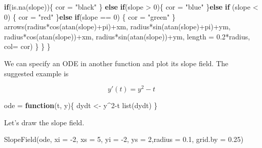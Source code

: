 \documentclass[
]{book}
\newenvironment{Shaded}{\begin{snugshade}}{\end{snugshade}}
\newcommand{\AttributeTok}[1]{\textcolor[rgb]{0.77,0.63,0.00}{#1}}
\newcommand{\ControlFlowTok}[1]{\textcolor[rgb]{0.13,0.29,0.53}{\textbf{#1}}}
\newcommand{\DecValTok}[1]{\textcolor[rgb]{0.00,0.00,0.81}{#1}}
\newcommand{\FloatTok}[1]{\textcolor[rgb]{0.00,0.00,0.81}{#1}}
\newcommand{\FunctionTok}[1]{\textcolor[rgb]{0.00,0.00,0.00}{#1}}
\newcommand{\NormalTok}[1]{#1}
\newcommand{\OtherTok}[1]{\textcolor[rgb]{0.56,0.35,0.01}{#1}}
\newcommand{\SpecialCharTok}[1]{\textcolor[rgb]{0.00,0.00,0.00}{#1}}
\newcommand{\StringTok}[1]{\textcolor[rgb]{0.31,0.60,0.02}{#1}}
\begin{document}
\begin{Shaded}
\begin{Highlighting}[]
      \ControlFlowTok{if}\NormalTok{(}\FunctionTok{is.na}\NormalTok{(slope))\{}
\NormalTok{        cor }\OtherTok{=} \StringTok{"black"}
\NormalTok{      \} }\ControlFlowTok{else} \ControlFlowTok{if}\NormalTok{(slope }\SpecialCharTok{\textgreater{}} \DecValTok{0}\NormalTok{)\{}
\NormalTok{        cor }\OtherTok{=} \StringTok{"blue"}
\NormalTok{      \}}\ControlFlowTok{else} \ControlFlowTok{if}\NormalTok{ (slope }\SpecialCharTok{\textless{}} \DecValTok{0}\NormalTok{) \{}
\NormalTok{        cor }\OtherTok{=} \StringTok{"red"}
\NormalTok{      \}}\ControlFlowTok{else} \ControlFlowTok{if}\NormalTok{(slope }\SpecialCharTok{==} \DecValTok{0}\NormalTok{) \{}
\NormalTok{        cor }\OtherTok{=} \StringTok{"green"}
\NormalTok{      \}}
      \FunctionTok{arrows}\NormalTok{(radius}\SpecialCharTok{*}\FunctionTok{cos}\NormalTok{(}\FunctionTok{atan}\NormalTok{(slope)}\SpecialCharTok{+}\NormalTok{pi)}\SpecialCharTok{+}\NormalTok{xm,}
\NormalTok{             radius}\SpecialCharTok{*}\FunctionTok{sin}\NormalTok{(}\FunctionTok{atan}\NormalTok{(slope)}\SpecialCharTok{+}\NormalTok{pi)}\SpecialCharTok{+}\NormalTok{ym,}
\NormalTok{             radius}\SpecialCharTok{*}\FunctionTok{cos}\NormalTok{(}\FunctionTok{atan}\NormalTok{(slope))}\SpecialCharTok{+}\NormalTok{xm,}
\NormalTok{             radius}\SpecialCharTok{*}\FunctionTok{sin}\NormalTok{(}\FunctionTok{atan}\NormalTok{(slope))}\SpecialCharTok{+}\NormalTok{ym, }
             \AttributeTok{length =} \FloatTok{0.2}\SpecialCharTok{*}\NormalTok{radius, }\AttributeTok{col=}\NormalTok{ cor)}
\NormalTok{    \}}
\NormalTok{  \}}
\NormalTok{\}}
\end{Highlighting}
\end{Shaded}

We can specify an ODE in another function and plot its slope field. The suggested example is

\[y'(t) = y^2 - t \]

\begin{Shaded}
\begin{Highlighting}[]
\NormalTok{ode }\OtherTok{=} \ControlFlowTok{function}\NormalTok{(t, y)\{}
\NormalTok{  dydt }\OtherTok{\textless{}{-}}\NormalTok{ y}\SpecialCharTok{\^{}}\DecValTok{2}\SpecialCharTok{{-}}\NormalTok{t}
  \FunctionTok{list}\NormalTok{(dydt)}
\NormalTok{\}}
\end{Highlighting}
\end{Shaded}

Let's draw the slope field.

\begin{Shaded}
\begin{Highlighting}[]
\FunctionTok{SlopeField}\NormalTok{(ode, }\AttributeTok{xi =} \SpecialCharTok{{-}}\DecValTok{2}\NormalTok{, }\AttributeTok{xs =} \DecValTok{5}\NormalTok{, }\AttributeTok{yi =} \SpecialCharTok{{-}}\DecValTok{2}\NormalTok{, }\AttributeTok{ys =} \DecValTok{2}\NormalTok{,}\AttributeTok{radius =} \FloatTok{0.1}\NormalTok{, }\AttributeTok{grid.by =} \FloatTok{0.25}\NormalTok{)}
\end{Highlighting}
\end{Shaded}
\end{document}
